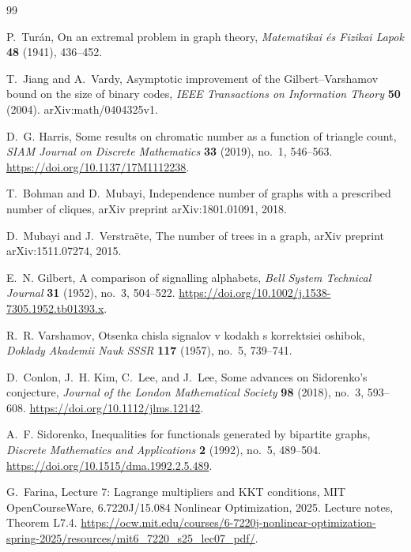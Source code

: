 \documentclass[12pt]{article}
\begin{document}
\begin{thebibliography}{99}

P.~Tur\'an,
\newblock On an extremal problem in graph theory,
\newblock \emph{Matematikai \'es Fizikai Lapok} \textbf{48} (1941), 436--452.

T.~Jiang and A.~Vardy,
\newblock Asymptotic improvement of the Gilbert--Varshamov bound on the size of binary codes,
\newblock \emph{IEEE Transactions on Information Theory} \textbf{50} (2004).
\newblock arXiv:math/0404325v1.

D.~G. Harris,
\newblock Some results on chromatic number as a function of triangle count,
\newblock \emph{SIAM Journal on Discrete Mathematics} \textbf{33} (2019), no.~1, 546--563.
\newblock \url{https://doi.org/10.1137/17M1112238}.

T.~Bohman and D.~Mubayi,
\newblock Independence number of graphs with a prescribed number of cliques,
\newblock arXiv preprint arXiv:1801.01091, 2018.

D.~Mubayi and J.~Verstra\"ete,
\newblock The number of trees in a graph,
\newblock arXiv preprint arXiv:1511.07274, 2015.

E.~N. Gilbert,
\newblock A comparison of signalling alphabets,
\newblock \emph{Bell System Technical Journal} \textbf{31} (1952), no.~3, 504--522.
\newblock \url{https://doi.org/10.1002/j.1538-7305.1952.tb01393.x}.

R.~R. Varshamov,
\newblock Otsenka chisla signalov v kodakh s korrektsiei oshibok,
\newblock \emph{Doklady Akademii Nauk SSSR} \textbf{117} (1957), no.~5, 739--741.

D.~Conlon, J.~H. Kim, C.~Lee, and J.~Lee,
\newblock Some advances on Sidorenko's conjecture,
\newblock \emph{Journal of the London Mathematical Society} \textbf{98} (2018), no.~3, 593--608.
\newblock \url{https://doi.org/10.1112/jlms.12142}.

A.~F. Sidorenko,
\newblock Inequalities for functionals generated by bipartite graphs,
\newblock \emph{Discrete Mathematics and Applications} \textbf{2} (1992), no.~5, 489--504.
\newblock \url{https://doi.org/10.1515/dma.1992.2.5.489}.

G.~Farina,
\newblock Lecture 7: Lagrange multipliers and KKT conditions,
\newblock MIT OpenCourseWare, 6.7220J/15.084 Nonlinear Optimization, 2025.
\newblock Lecture notes, Theorem L7.4.
\newblock \url{https://ocw.mit.edu/courses/6-7220j-nonlinear-optimization-spring-2025/resources/mit6_7220_s25_lec07_pdf/}.


\end{thebibliography}
\end{document}
